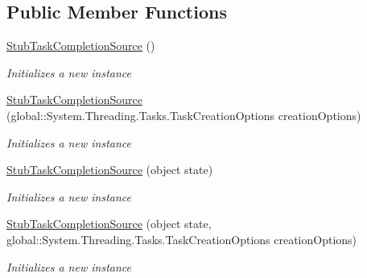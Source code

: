 \subsection*{Public Member Functions}
\begin{DoxyCompactItemize}
\item 
\hyperlink{class_system_1_1_threading_1_1_tasks_1_1_fakes_1_1_stub_task_completion_source_3_01_t_result_01_4_a90953b59fd3dadc273f848565ec57381}{Stub\-Task\-Completion\-Source} ()
\begin{DoxyCompactList}\small\item\em Initializes a new instance\end{DoxyCompactList}\item 
\hyperlink{class_system_1_1_threading_1_1_tasks_1_1_fakes_1_1_stub_task_completion_source_3_01_t_result_01_4_acab60f3adaf29d3501e760e5fa1a597b}{Stub\-Task\-Completion\-Source} (global\-::\-System.\-Threading.\-Tasks.\-Task\-Creation\-Options creation\-Options)
\begin{DoxyCompactList}\small\item\em Initializes a new instance\end{DoxyCompactList}\item 
\hyperlink{class_system_1_1_threading_1_1_tasks_1_1_fakes_1_1_stub_task_completion_source_3_01_t_result_01_4_ac301190509d3f2f21dad0acd1ba8dab3}{Stub\-Task\-Completion\-Source} (object state)
\begin{DoxyCompactList}\small\item\em Initializes a new instance\end{DoxyCompactList}\item 
\hyperlink{class_system_1_1_threading_1_1_tasks_1_1_fakes_1_1_stub_task_completion_source_3_01_t_result_01_4_a6c760fa53dd82cde12bc981783635a2d}{Stub\-Task\-Completion\-Source} (object state, global\-::\-System.\-Threading.\-Tasks.\-Task\-Creation\-Options creation\-Options)
\begin{DoxyCompactList}\small\item\em Initializes a new instance\end{DoxyCompactList}\end{DoxyCompactItemize}
